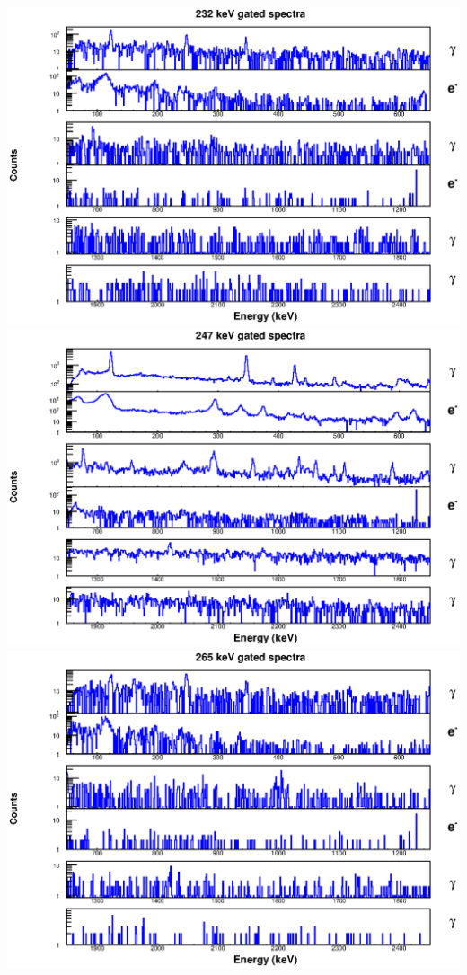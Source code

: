 \begin{landscape}
\includegraphics[scale=1.1]{154Gd_Appendix/232_combined.eps}
\includegraphics[scale=1.1]{154Gd_Appendix/247_combined.eps}
\includegraphics[scale=1.1]{154Gd_Appendix/265_combined.eps}

\end{landscape}
